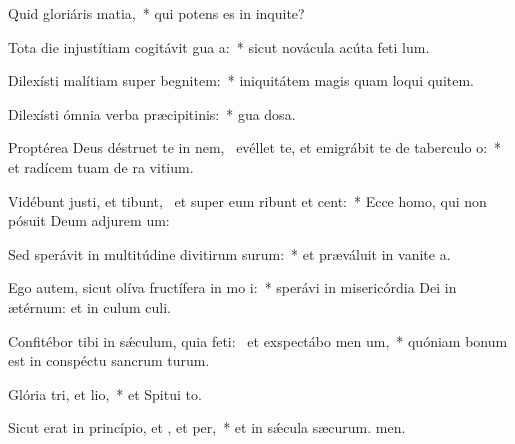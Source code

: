 \item Quid gloriáris  matia,~* qui potens es in inquite?
\item Tota die injustítiam cogitávit gua a:~* sicut novácula acúta feti lum.
\item Dilexísti malítiam super begnitem:~* iniquitátem magis quam loqui quitem.
\item Dilexísti ómnia verba præcipitinis:~* gua dosa.
\item Proptérea Deus déstruet te in nem,~\pscross{} evéllet te, et emigrábit te de taberculo o:~* et radícem tuam de ra vitium.
\item Vidébunt justi, et tibunt,~\pscross{} et super eum ribunt et cent:~* Ecce homo, qui non pósuit Deum adjurem um:
\item Sed sperávit in multitúdine divitirum surum:~* et præváluit in vanite a.
\item Ego autem, sicut olíva fructífera in mo i:~* sperávi in misericórdia Dei in ætérnum: et in culum culi.
\item Confitébor tibi in sǽculum, quia feti:~\pscross{} et exspectábo men um,~* quóniam bonum est in conspéctu sancrum turum.
\item Glória tri, et lio,~* et Spitui to.
\item Sicut erat in princípio, et , et per,~* et in sǽcula sæcurum. men.
